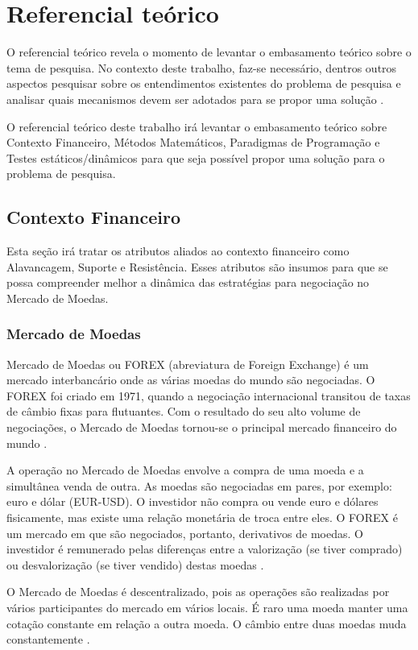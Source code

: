 \chapter{Referencial teórico}

O referencial teórico revela o momento de levantar o embasamento teórico sobre o tema de pesquisa. No contexto deste trabalho, faz-se necessário, dentros outros aspectos pesquisar sobre os entendimentos existentes do problema de pesquisa e analisar quais mecanismos devem ser adotados para se propor uma solução \cite{belchior2012}.

O referencial teórico deste trabalho irá levantar o embasamento teórico sobre Contexto Financeiro, Métodos Matemáticos, Paradigmas de Programação e Testes estáticos/dinâmicos para que seja possível propor uma solução para o problema de pesquisa.

\section{Contexto Financeiro}
Esta seção irá tratar os atributos aliados ao contexto financeiro como Alavancagem, Suporte e Resistência. Esses atributos são insumos para que se possa compreender melhor a dinâmica das estratégias para negociação no Mercado de Moedas.

\subsection{Mercado de Moedas}
Mercado de Moedas ou FOREX (abreviatura de Foreign Exchange) é um mercado interbancário onde as várias moedas do mundo são negociadas. O FOREX foi criado em 1971, quando a negociação internacional transitou de taxas de câmbio fixas para flutuantes. Com o resultado do seu alto volume de negociações, o Mercado de Moedas tornou-se o principal mercado financeiro do mundo \cite{market2011}.

A operação no Mercado de Moedas envolve a compra de uma moeda e a simultânea venda de outra. As moedas são negociadas em pares, por exemplo: euro e dólar (EUR-USD). O investidor não compra ou vende euro e dólares fisicamente, mas existe uma relação monetária de troca entre eles. O FOREX é um mercado em que são negociados, portanto, derivativos de moedas. O investidor é remunerado pelas diferenças entre a valorização (se tiver comprado) ou desvalorização (se tiver vendido) destas moedas \cite[pág.~3]{cvm2009}.

O Mercado de Moedas é descentralizado, pois as operações são realizadas por vários participantes do mercado em vários locais. É raro uma moeda manter uma cotação constante em relação a outra moeda. O câmbio entre duas moedas muda constantemente \cite[pág.~5]{fxcm2011}.

